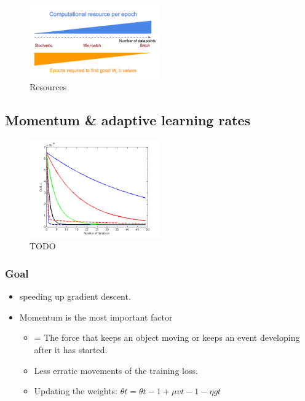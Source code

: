 \documentclass{article}
\begin{document}
\begin{figure}[H]
    \centering
    \includegraphics[width=0.5\textwidth]{img/gradient-descent-modes-resources.png}
    \caption{Resources}
\end{figure}

\subsection{Momentum \& adaptive learning rates}

\begin{figure}[H]
    \centering
    \includegraphics[width=0.5\textwidth]{img/momentum-adaptive-learning-rates.png}
    \caption{TODO}
\end{figure}


\subsubsection{Goal}

\begin{itemize}
    \item speeding up gradient descent.
    \item Momentum is the most important factor
    \begin{itemize}
        \item = The force that keeps an object moving or keeps an event developing after it has started.
        \item Less erratic movements of the training loss.
        \item Updating the weights: $\theta t = \theta t - 1 + \mu v t - 1 - \eta g t$ 
    \end{itemize}
\end{itemize}
\end{document}
